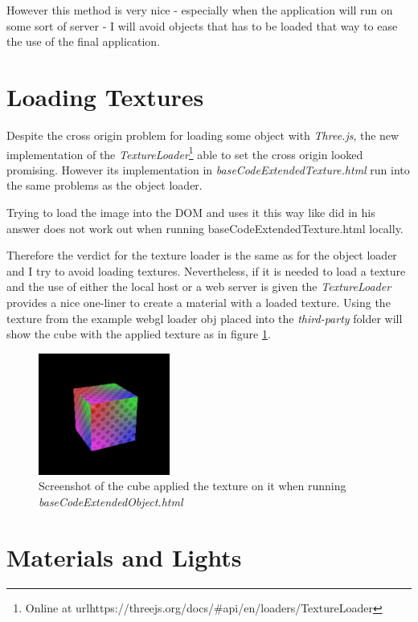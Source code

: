 However this method is very nice - especially when the application will run on some sort of server -  I will avoid objects that has to be loaded that way to ease the use of the final application.

\section{Loading Textures}

Despite the cross origin problem for loading some object with \textit{Three.js}, the new implementation of the \textit{TextureLoader}\footnote{Online at url{https://threejs.org/docs/\#api/en/loaders/TextureLoader}} able to set the cross origin looked promising. However its implementation in \textit{baseCodeExtendedTexture.html} run into the same problems as the object loader. 

Trying to load the image into the DOM and uses it this way like \cite{2pha2015JavascriptOverflow} did in his answer does not work out when running {baseCodeExtendedTexture.html} locally.

Therefore the verdict for the texture loader is the same as for the object loader and I try to avoid loading textures. Nevertheless, if it is needed to load a texture and the use of either the local host or a web server is given  the \textit{TextureLoader} provides a nice one-liner to create a material with a loaded texture. Using the texture from the example {webgl loader obj} placed into the \textit{third-party} folder will show the cube with the applied texture as in figure \ref{fig:textured cube}.

\begin{figure}[h]
    \centering
    \includegraphics[height=4cm]{Document/Figures/chapter2/ScreenshotTexturedCube.jpg}
    \caption[Screenshot of the cube applied the texture on it]{Screenshot of the cube applied the texture on it when  running \mbox{\textit{baseCodeExtendedObject.html}}}
    \label{fig:textured cube}
\end{figure}

\section{Materials and Lights}

